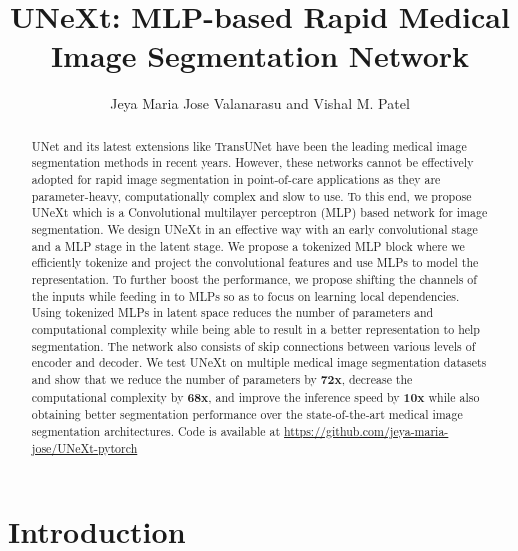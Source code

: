 \documentclass[runningheads]{llncs}
\begin{document}
\title{UNeXt: MLP-based Rapid Medical Image Segmentation Network}
\author{Jeya Maria Jose Valanarasu and Vishal M. Patel } 
\maketitle              \begin{abstract}


UNet and its latest extensions like TransUNet have been the leading medical image segmentation methods in recent years. However, these networks cannot be effectively adopted for rapid image segmentation in point-of-care applications as they are parameter-heavy, computationally complex and slow to use.  To this end, we propose UNeXt which is a Convolutional multilayer perceptron (MLP) based network for image segmentation. We design UNeXt in an effective way with an early convolutional stage and a MLP stage in the latent stage. We propose a tokenized MLP block where we efficiently tokenize and project the convolutional features and use MLPs to model the representation. To further boost the performance, we propose shifting the channels of the inputs while feeding in to MLPs so as to focus on learning local dependencies. Using tokenized MLPs in latent space reduces the number of parameters and computational complexity while being able to result in a better representation to help segmentation. The network also consists of skip connections between various levels of encoder and decoder.   We test UNeXt on multiple medical image segmentation datasets and show that we reduce the number of parameters by \textbf{72x}, decrease the computational complexity by \textbf{68x}, and improve the inference speed by \textbf{10x} while also obtaining better segmentation performance over the  state-of-the-art medical image segmentation architectures. Code is available at \href{https://github.com/jeya-maria-jose/UNeXt-pytorch}{https://github.com/jeya-maria-jose/UNeXt-pytorch}

\end{abstract}
\section{Introduction}
\end{document}
